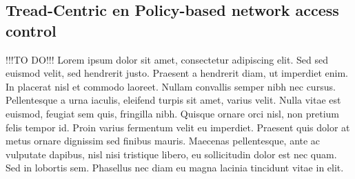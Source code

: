\subsection{Tread-Centric en Policy-based network access control}
\label{sec:trepo}
	!!!TO DO!!! Lorem ipsum dolor sit amet, consectetur adipiscing elit. Sed sed euismod velit, sed hendrerit justo. Praesent a hendrerit diam, ut imperdiet enim. In placerat nisl et commodo laoreet. Nullam convallis semper nibh nec cursus. Pellentesque a urna iaculis, eleifend turpis sit amet, varius velit. Nulla vitae est euismod, feugiat sem quis, fringilla nibh. Quisque ornare orci nisl, non pretium felis tempor id. Proin varius fermentum velit eu imperdiet. Praesent quis dolor at metus ornare dignissim sed finibus mauris. Maecenas pellentesque, ante ac vulputate dapibus, nisl nisi tristique libero, eu sollicitudin dolor est nec quam. Sed in lobortis sem. Phasellus nec diam eu magna lacinia tincidunt vitae in elit.

